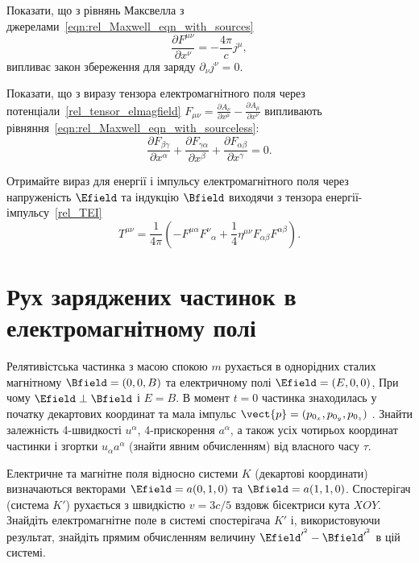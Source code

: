 \begin{problem}
Показати, що з рівнянь Максвелла з джерелами~\eqref{eqn:rel_Maxwell_eqn_with_sources}
\[
	\frac{\partial F^{\mu\nu}}{\partial x^\nu} = -\frac{4\pi}{c}j^\mu,
\]
випливає закон збереження для заряду $\partial_\nu j^{\nu} = 0$.
\end{problem}

\begin{problem}
Показати, що з виразу тензора електромагнітного поля через потенціали~\eqref{rel_tensor_elmagfield} $F_{\mu\nu} = \frac{\partial A_\nu}{\partial  x^\mu} - \frac{\partial A_\mu}{\partial  x^\nu}$ випливають рівняння~\eqref{eqn:rel_Maxwell_eqn_with_sourceless}:
\[
    \frac{\partial F_{\beta\gamma}}{\partial x^\alpha} + \frac{\partial F_{\gamma\alpha}}{\partial x^\beta} +\frac{\partial
				F_{\alpha\beta}}{\partial x^\gamma}  = 0.
\]
\end{problem}


\begin{problem}
Отримайте вираз для енергії і імпульсу електромагнітного поля через напруженість $\Efield$ та індукцію $\Bfield$ виходячи з тензора енергії-імпульсу~\eqref{rel_TEI}
\[
	T^{\mu\nu} = \frac{1}{4\pi}\left( -F^{\mu \alpha}F^\nu_{\;\;\alpha} + \frac14\eta^{\mu\nu}F_{\alpha\beta}F^{\alpha\beta}\right).
\]
\end{problem}

\section{Рух заряджених частинок в електромагнітному полі}

\begin{problem}
Релятивістська частинка з масою спокою $m$ рухається в однорідних сталих  магнітному  $\Bfield = (0,0,B)$ та електричному полі $\Efield = (E,0,0)$, При чому $\Efield\perp\Bfield$  і $E = B$. В момент $t=0$ частинка знаходилась у початку декартових координат та мала імпульс $\vect{p} = (p_{0_x}, p_{0_y}, p_{0_z})$ . Знайти залежність 4-швидкості $u^{\alpha}$, 4-прискорення $a^{\alpha}$, а також усіх чотирьох координат частинки і згортки $u_{\alpha}a^{\alpha}$  (знайти явним обчисленням) від власного часу $\tau$.
\end{problem}

\begin{problem}
Електричне та магнітне поля відносно системи $K$ (декартові координати) визначаються векторами $\Efield = a(0,1,0)$ та $\Bfield = a(1,1,0)$. Спостерігач (система $K'$) рухається з швидкістю $v=3c/5$ вздовж бісектриси кута $XOY$. Знайдіть електромагнітне поле в системі спостерігача $K'$ і, використовуючи результат, знайдіть прямим обчисленням величину $\Efield^{\prime^2} - \Bfield^{\prime^2}$  в цій системі.
\end{problem}

